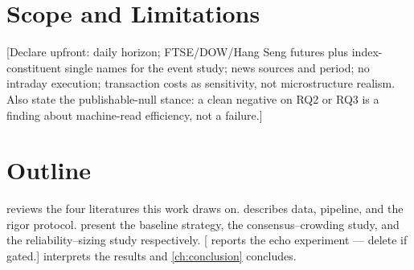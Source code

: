 \section{Scope and Limitations}
\label{sec:scope}

[Declare upfront: daily horizon; FTSE/DOW/Hang Seng futures plus
index-constituent single names for the event study; news sources and
period; no intraday execution; transaction costs as sensitivity, not
microstructure realism. Also state the publishable-null stance: a
clean negative on RQ2 or RQ3 is a finding about machine-read
efficiency, not a failure.]

\section{Outline}
\label{sec:outline}

 reviews the four literatures this work draws on.
 describes data, pipeline, and the rigor protocol.
 present the baseline strategy,
the consensus--crowding study, and the reliability--sizing study
respectively. [ reports the echo experiment ---
delete if gated.]  interprets the results and
\cref{ch:conclusion} concludes.
